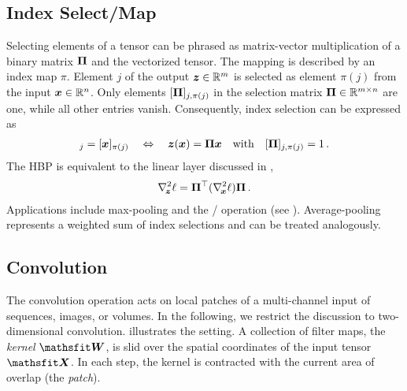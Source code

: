 \subsection{Index Select/Map}\label{hbp::subsec:HBPIndexSelect}
Selecting elements of a tensor can be phrased as matrix-vector multiplication of
a binary matrix ${\bm{\Pi}}$ and the vectorized tensor. The mapping is described by an
index map $\pi$. Element $j$ of the output ${\bm{z}}\in \mathbb{R}^m$ is selected as
element $\pi(j)$ from the input ${\bm{x}}\in \mathbb{R}^n$. Only elements $[{\bm{\Pi}}]_{j,
  \pi(j)}$ in the selection matrix ${\bm{\Pi}}\in \mathbb{R}^{m\times n}$ are one,
while all other entries vanish. Consequently, index selection can be expressed
as
\begin{align*}
  [\vz]_j = [\vx]_{\pi(j)} \quad \Leftrightarrow\quad \vz(\vx) = \mPi \vx \quad \text{with} \quad [\mPi]_{j,\pi(j)} = 1\,.
\end{align*}
The HBP is equivalent to the linear layer discussed in
,
\begin{align*}
  \nabla_{\!{{\bm{z}}}}^{2}\ell = {\bm{\Pi}}^\top (\nabla_{\!{{\bm{x}}}}^{2}\ell) {\bm{\Pi}}\,.
\end{align*}
Applications include max-pooling and the /
operation (see ). Average-pooling represents a
weighted sum of index selections and can be treated analogously.

\subsection{Convolution}\label{hbp::subsec:convolutions}
The convolution operation acts on local patches of a multi-channel input of
sequences, images, or volumes. In the following, we restrict the discussion to
two-dimensional convolution. 
illustrates the setting. A collection of filter maps, the \emph{kernel} $\tW$,
is slid over the spatial coordinates of the input tensor $\tX$. In each step,
the kernel is contracted with the current area of overlap (the \emph{patch}).

